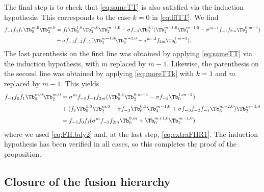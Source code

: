 \documentclass[11pt]{article}
\numberwithin{equation}{section}
\theoremstyle{plain}
\numberwithin{equation}{section}
\begin{document}
The final step is to check that \eqref{eq:sameTT} is also satisfied via the induction hypothesis. This corresponds to the case $k=0$ in \eqref{eq:fffTT}. We find
\begin{alignat}{2}
f_{-1}f_0f_1\Tb^{m,0}_0 \Tb^{m,0}_2 &= f_1\Tb^{1,0}_0 \Tb^{m,0}_2\Tb^{m-1,0}_2 - \sigma f_{-3} \Tb^{0,1}_0(\Tb^{m-1,0}_2\Tb^{m-1,0}_4-\sigma^{m-1}f_{-1}f_{2m}\Tb^{0,m-1}_2)
\nonumber\\[0.1cm]&
+ \sigma f_{-3}f_{-2}f_{-1} (\Tb^{m-1,0}_2\Tb^{m-2,0}_6-\sigma^{m-2} f_{2m}\Tb^{1,m-2}_0).
\end{alignat}
The last parenthesis on the first line was obtained by applying \eqref{eq:sameTT} via the induction hypothesis, with $m$ replaced by $m-1$. Likewise, the parenthesis on the second line was obtained by applying \eqref{eq:moreTTk} with $k=1$ and $m$ replaced by $m-1$. This yields
\begin{alignat}{2}
f_{-1}f_0f_1\Tb^{m,0}_0 \Tb^{m,0}_2 &= \sigma^m f_{-3}f_{-1}f_{2m}(\Tb^{0,1}_0\Tb^{0,m-1}_2 - \sigma f_{-2}\Tb^{1,m-2}_0)
\nonumber\\[0.1cm]
&+ (f_1 \Tb^{1,0}_0\Tb^{m,0}_2-\sigma f_{-3}\Tb^{0,1}_0 \Tb^{m-1,0}_4 + \sigma f_{-3}f_{-2}f_{-1}\Tb^{m-2,0}_6)\Tb^{m-4,0}_2
\nonumber\\[0.1cm]
& = f_{-1}f_0f_1(\sigma^m f_{-3}f_{2m}\Tb^{0,m}_0 + \Tb^{m+1,0}_0\Tb^{m-1,0}_2)
\end{alignat}
where we used \eqref{eq:FH.bdy2} and, at the last step, \eqref{eq:extraFHR1}. The induction hypothesis has been verified in all cases, so this completes the proof of the proposition.
\eproof

\subsection{Closure of the fusion hierarchy}\label{sec:FHclosure.proof}
\end{document}
